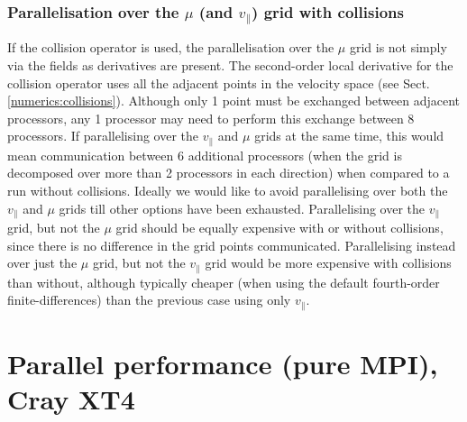 \subsubsection{Parallelisation over the $\mu$ (and $v_\parallel$) grid with collisions}

If the collision operator is used, the parallelisation over the $\mu$ grid is not simply via the fields as derivatives are
present. The second-order local derivative for the collision operator uses all the adjacent points in the velocity space
(see Sect. \ref{numerics:collisions}). Although only 1 point must be exchanged between adjacent processors, any 1 processor
may need to perform this exchange between 8 processors. If parallelising over the $v_\parallel$ and $\mu$ grids at the same time, this would mean
communication between 6 additional processors (when the grid is decomposed over more than 2 processors in each direction) when compared to a run without
collisions. Ideally we would like to avoid parallelising over both the $v_\parallel$ and $\mu$ grids till other options have been exhausted.
Parallelising over the $v_\parallel$ grid, but not the $\mu$ grid should be equally expensive with or without collisions, since there is no difference
in the grid points communicated. Parallelising instead over just the $\mu$ grid, but not the $v_\parallel$ grid would be more expensive with collisions than without, although typically cheaper (when using the default
fourth-order finite-differences) than the previous case using only $v_\parallel$.

\section{Parallel performance (pure MPI), Cray XT4 \label{scaling-orig}}

